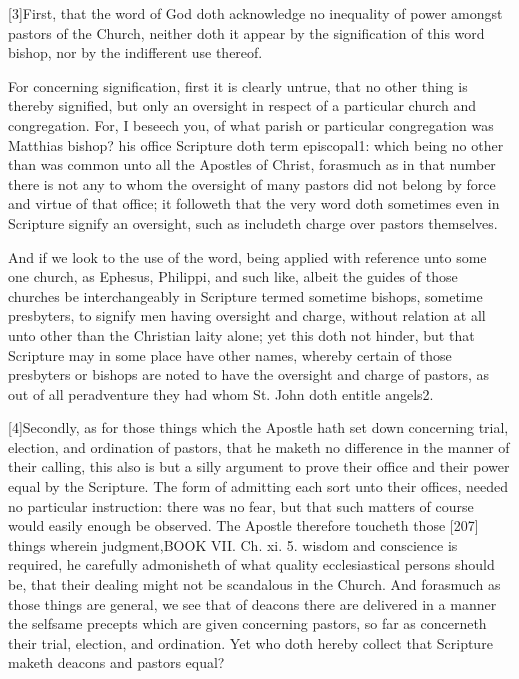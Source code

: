 [3]First, that the word of God doth acknowledge no inequality of power amongst pastors of the Church, neither doth it appear by the signification of this word bishop, nor by the indifferent use thereof.

For concerning signification, first it is clearly untrue, that no other thing is thereby signified, but only an oversight in respect of a particular church and congregation. For, I beseech you, of what parish or particular congregation was Matthias bishop? his office Scripture doth term episcopal1: which being no other than was common unto all the Apostles of Christ, forasmuch as in that number there is not any to whom the oversight of many pastors did not belong by force and virtue of that office; it followeth that the very word doth sometimes even in Scripture signify an oversight, such as includeth charge over pastors themselves.

And if we look to the use of the word, being applied with reference unto some one church, as Ephesus, Philippi, and such like, albeit the guides of those churches be interchangeably in Scripture termed sometime bishops, sometime presbyters, to signify men having oversight and charge, without relation at all unto other than the Christian laity alone; yet this doth not hinder, but that Scripture may in some place have other names, whereby certain of those presbyters or bishops are noted to have the oversight and charge of pastors, as out of all peradventure they had whom St. John doth entitle angels2.

[4]Secondly, as for those things which the Apostle hath set down concerning trial, election, and ordination of pastors, that he maketh no difference in the manner of their calling, this also is but a silly argument to prove their office and their power equal by the Scripture. The form of admitting each sort unto their offices, needed no particular instruction: there was no fear, but that such matters of course would easily enough be observed. The Apostle therefore toucheth those [207] things wherein judgment,BOOK VII. Ch. xi. 5. wisdom and conscience is required, he carefully admonisheth of what quality ecclesiastical persons should be, that their dealing might not be scandalous in the Church. And forasmuch as those things are general, we see that of deacons there are delivered in a manner the selfsame precepts which are given concerning pastors, so far as concerneth their trial, election, and ordination. Yet who doth hereby collect that Scripture maketh deacons and pastors equal?

